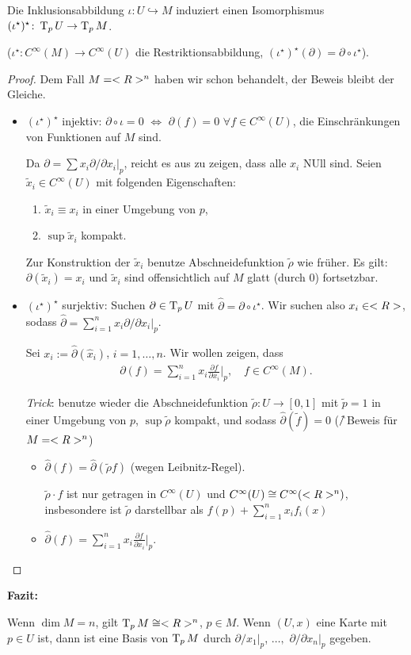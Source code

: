 \begin{proposition}
	Die Inklusionsabbildung $\iota\colon U\hookrightarrow M$ induziert einen Isomorphismus $(\iota^\star)^\star\colon \operatorname{T}_p U\to \operatorname{T}_p M$.
	
	($\iota^\star\colon C^\infty(M)\to C^\infty(U)$ die Restriktionsabbildung, $(\iota^\star)^\star(\partial) = \partial\circ \iota^\star$).
\end{proposition}
\begin{proof}
	Dem Fall $M=<R>^n$ haben wir schon behandelt, der Beweis bleibt der Gleiche.\begin{itemize}
		\item $(\iota^\star)^\star$ injektiv: $\partial\circ \iota = 0$ $\Leftrightarrow$ $\partial(f) = 0$ $\forall f\in C^\infty(U)$, die Einschränkungen von Funktionen auf $M$ sind.
		
		Da $\partial = \sum x_i\partial\slash\partial x_i\big|_p$, reicht es aus zu zeigen, dass alle $x_i$ NUll sind. Seien $\tilde x_i\in C^\infty(U)$ mit folgenden Eigenschaften: \begin{enumerate}[label={\arabic*)}]
			\item $\tilde x_i \equiv x_i$ in einer Umgebung von $p$,
			\item $\sup\tilde x_i$ kompakt.
		\end{enumerate}
	Zur Konstruktion der $\tilde x_i$ benutze Abschneidefunktion $\tilde\rho$ wie früher. Es gilt: $\partial(\tilde x_i) = x_i$ und $\tilde x_i$ sind offensichtlich auf $M$ glatt (durch 0) fortsetzbar.
	\item $(\iota^\star)^\star$ surjektiv: Suchen $\partial\in\operatorname{T}_p U$ mit $\hat \partial = \partial\circ \iota^\star$. Wir suchen also $x_i\in<R>$, sodass $\hat\partial =\sum_{i=1}^n x_i\partial\slash\partial x_i\big|_p$.
	
	Sei $x_i := \hat\partial(\hat x_i)$, $i=1,\dots,n$. Wir wollen zeigen, dass \begin{align*}
		\partial(f) = \sum_{i=1}^n x_i\frac{\partial f}{\partial x_i}\bigg|_p,\quad f\in C^\infty(M).
	\end{align*}
	
	\emph{Trick}: benutze wieder die Abschneidefunktion $\tilde\rho\colon U\to [0,1]$ mit $\tilde p=1$ in einer Umgebung von $p$, $\sup\tilde\rho$ kompakt, und sodass $\hat\partial(\tilde f) = 0$ ($\nnearrow$Beweis für $M=<R>^n$)\begin{itemize}[label={$\Rightarrow$}]
		\item $\hat\partial (f) = \hat\partial(\tilde\rho f)$ (wegen Leibnitz-Regel).
		
		$\tilde\rho\cdot f$ ist nur getragen in $C^\infty(U)$ und $C^\infty(U)\cong C^\infty(<R>^n)$, insbesondere ist $\tilde\rho$ darstellbar als $f(p) + \sum_{i=1}^n x_i f_i(x)$
		\item $\hat\partial(f) = \sum_{i=1}^n x_i\frac{\partial f}{\partial x_i}\!\big|_p$.
	\end{itemize}
	\end{itemize}
\end{proof}

\textbf{Fazit:}\begin{conclusion}
	Wenn $\dim M=n$, gilt $\operatorname{T}_p M\cong <R>^n$, $p\in M$. Wenn $(U,x)$ eine Karte mit $p\in U$ ist, dann ist eine Basis von $\operatorname{T}_p M$ durch $\partial\slash x_1\big|_p$, $\dots,$ $\partial\slash\partial x_n\big|_p$ gegeben.
\end{conclusion}